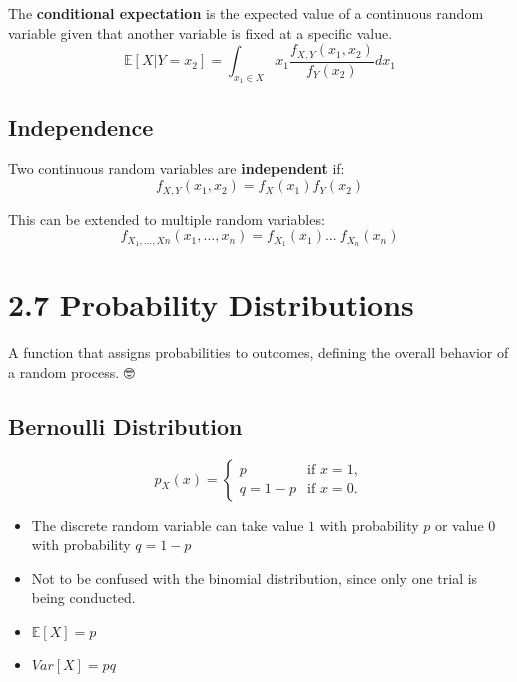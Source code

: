 \documentclass[
  letterpaper,
  DIV=11,
  numbers=noendperiod]{scrreprt}
\providecommand{\tightlist}{%
  \setlength{\itemsep}{0pt}\setlength{\parskip}{0pt}}\usepackage{longtable,booktabs,array}
\begin{document}
The \textbf{conditional expectation} is the expected value of a
continuous random variable given that another variable is fixed at a
specific value. \[ 
\mathbb{E}[X| Y = x_{2}] = \int_{x_{1} \in X} x_{1} \frac{f_{X,Y}(x_{1}, x_{2})}{f_{Y}(x_{2})} dx_{1} 
\]

\section{Independence}\label{independence-2}

Two continuous random variables are \textbf{independent} if: \[ 
f_{X,Y}(x_{1}, x_{2}) = f_{X}(x_{1}) f_{Y}(x_{2}) 
\]

This can be extended to multiple random variables: \[ 
f_{X_{1},...,X{n}}(x_{1}, ..., x_{n}) = f_{X_{1}}(x_{1}) ... \ f_{X_{n}}(x_{n}) 
\]

\chapter{2.7 Probability Distributions}\label{probability-distributions}

\begin{tcolorbox}[enhanced jigsaw, colback=white, left=2mm, breakable, opacityback=0, bottomrule=.15mm, rightrule=.15mm, arc=.35mm, colframe=quarto-callout-note-color-frame, leftrule=.75mm, toprule=.15mm]

A function that assigns probabilities to outcomes, defining the overall
behavior of a random process. 🤓

\end{tcolorbox}

\section{Bernoulli Distribution}\label{bernoulli-distribution}

\[
p_{X}(x) =
\begin{cases}
    p & \text{if } x = 1, \\
    q = 1-p & \text{if } x = 0.
\end{cases}
\]

\begin{itemize}
\tightlist
\item
  The discrete random variable can take value \(1\) with probability
  \(p\) or value \(0\) with probability \(q = 1 - p\)
\item
  Not to be confused with the binomial distribution, since only one
  trial is being conducted.
\item
  \(\mathbb{E}[X] = p\)
\item
  \(Var[X] = pq\)
\end{itemize}
\end{document}
